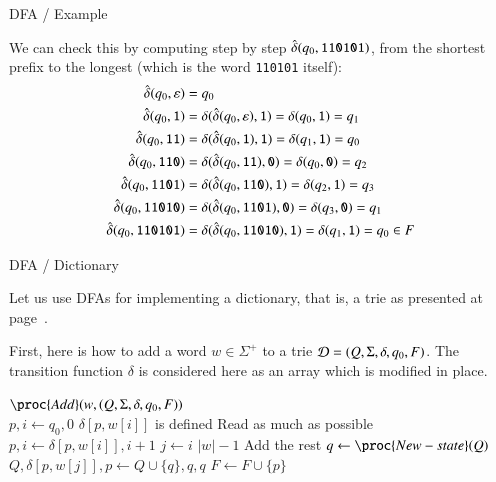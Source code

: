\documentclass[compress,dvips,xcolor={dvipsnames},t]{beamer}
\newcommand\len[1]{\left\lvert{#1}\right\rvert\xspace}
\begin{document}
%
\begin{frame}[fragile]{DFA / Example}

We can check this by computing step by step
\(\hat{\delta}(q_0,\verb+110101+)\), from the shortest prefix to the
longest (which is the word \verb+110101+ itself):
\[
\begin{aligned}
  \hat{\delta} (q_0, \varepsilon)
&= q_0\\
   \hat{\delta} (q_0, \verb+1+)
&= \delta (\hat{\delta} (q_0, \varepsilon), \verb+1+)
= \delta (q_0, \verb+1+)
= q_1\\
   \hat{\delta} (q_0, \verb+11+)
&= \delta (\hat{\delta} (q_0, \verb+1+), \verb+1+)
= \delta (q_1, \verb+1+)
= q_0\\
   \hat{\delta} (q_0, \verb+110+)
&= \delta (\hat{\delta} (q_0, \verb+11+), \verb+0+)
= \delta (q_0, \verb+0+)
= q_2\\
   \hat{\delta} (q_0, \verb+1101+)
&= \delta (\hat{\delta} (q_0, \verb+110+), \verb+1+)
= \delta (q_2, \verb+1+)
= q_3\\
   \hat{\delta} (q_0, \verb+11010+)
&= \delta (\hat{\delta} (q_0, \verb+1101+), \verb+0+)
= \delta (q_3, \verb+0+)
= q_1\\
   \hat{\delta} (q_0, \verb+110101+)
&= \delta (\hat{\delta} (q_0, \verb+11010+), \verb+1+)
= \delta (q_1, \verb+1+)
= q_0 \in F
\end{aligned}
\]

\end{frame}

%
\begin{frame}{DFA / Dictionary}

Let us use DFAs for implementing a dictionary, that is, a trie as
presented at page~\pageref{trie_then}.

\bigskip
First, here is how to add a word \(w \in \Sigma^{+}\) to a trie
\({\cal D} = (Q, \Sigma, \delta, q_0, F)\). The transition function
\(\delta\) is considered here as an array which is modified in place.
\begin{codebox}
\(\proc{Add} (w, (Q, \Sigma, \delta, q_0, F))\)\\
\li \(p, i \gets q_0, 0\)
\li \While \(\delta[p,w[i]]\) is defined \>\RComment Read as much as possible
\li   \> \(p, i \gets \delta[p,w[i]], i + 1\)
\li \For \(j \gets i\) \To \(\len{w} - 1\) \>\RComment Add the rest
\li \> \(q \gets \proc{New-state}(Q)\)
\li \> \(Q, \delta[p, w[j]], p \gets Q \cup \{q\}, q, q\)
\li \(F \gets F \cup \{p\}\)
\end{codebox}

\end{frame}
\end{document}
